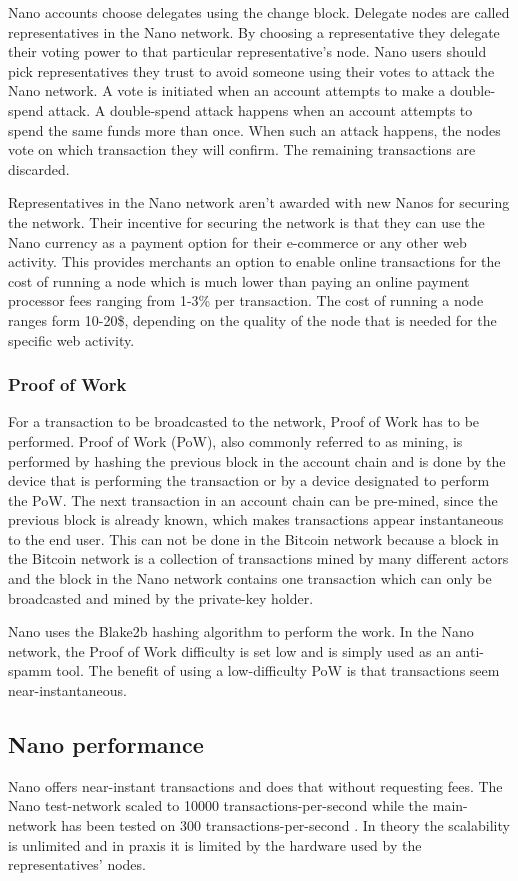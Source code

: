 \documentclass{ferseminar}
\begin{document}
Nano accounts choose delegates using the change block. Delegate nodes are called representatives in the Nano network. By choosing a representative they delegate their voting power to that particular representative's node. Nano users should pick representatives they trust to avoid someone using their votes to attack the Nano network. A vote is initiated when an account attempts to make a double-spend attack. A double-spend attack happens when an account attempts to spend the same funds more than once. When such an attack happens, the nodes vote on which transaction they will confirm. The remaining transactions are discarded.

Representatives in the Nano network aren't awarded with new Nanos for securing the network. Their incentive for securing the network is that they can use the Nano currency as a payment option for their e-commerce or any other web activity. This provides merchants an option to enable online transactions for the cost of running a node which is much lower than paying an online payment processor fees ranging from 1-3\% per transaction. The cost of running a node ranges form 10-20\$, depending on the quality of the node that is needed for the specific web activity.
\subsubsection{Proof of Work}

For a transaction to be broadcasted to the network, Proof of Work has to be performed. Proof of Work (PoW), also commonly referred to as mining, is performed by hashing the previous block in the account chain and is done by the device that is performing the transaction or by a device designated to perform the PoW. The next transaction in an account chain can be pre-mined, since the previous block is already known, which makes transactions appear instantaneous to the end user. This can not be done in the Bitcoin network because a block in the Bitcoin network is a collection of transactions mined by many different actors and the block in the Nano network contains one transaction which can only be broadcasted and mined by the private-key holder.

Nano uses the Blake2b hashing algorithm to perform the work. In the Nano network, the Proof of Work difficulty is set low and is simply used as an anti-spamm tool. The benefit of using a low-difficulty PoW is that transactions seem near-instantaneous.


\subsection{Nano performance}
Nano offers near-instant transactions and does that without requesting fees. The Nano test-network scaled to 10000 transactions-per-second while the main-network has been tested on 300 transactions-per-second \cite{Stress}. In theory the scalability is unlimited and in praxis it is limited by the hardware used by the representatives' nodes.
\end{document}
